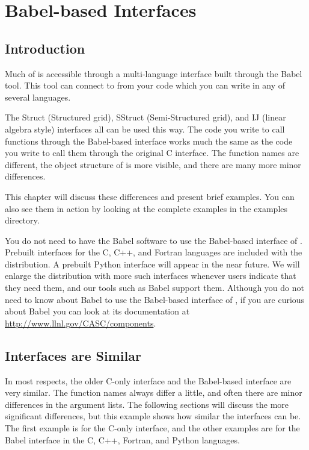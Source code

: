 
\chapter{Babel-based Interfaces}
\label{ch-babel}

\section{Introduction}

Much of \hypre{} is accessible through a multi-language interface
built through the Babel tool.  This tool can connect to \hypre{} from
your code which you can write in any of several languages.

The Struct (Structured grid), SStruct (Semi-Structured grid), and IJ
(linear algebra style) interfaces all can be used
this way.  The code you write to call \hypre{} functions through the
Babel-based interface works much the same as the code you write to
call them through the original C interface.  The function names are
different, the object structure of \hypre{} is more visible, and there
are many more minor differences.

This chapter will discuss these differences and present brief
examples.  You can also see them in action by looking at the complete
examples in the examples directory.

You do not need to have the Babel software to use the Babel-based
interface of \hypre{}.  Prebuilt interfaces for the C, C++, and
Fortran languages are included with the \hypre{} distribution.  A
prebuilt Python interface will appear in the near future.  We will
enlarge the distribution with more such interfaces whenever \hypre{}
users indicate that they need them, and our tools such as Babel
support them.  Although you do not need to know about Babel to use the
Babel-based interface of \hypre{}, if you are curious about Babel you
can look at its documentation at
\url{http://www.llnl.gov/CASC/components}.

\section{Interfaces are Similar}

In most respects, the older C-only interface and the Babel-based
interface are very similar. The function names always differ a little,
and often there are minor differences in the argument lists.  The
following sections will discuss the more significant differences, but
this example shows how similar the interfaces can be.  The first
example is for the C-only interface, and the other examples are for
the Babel interface in the C, C++, Fortran, and Python languages.


